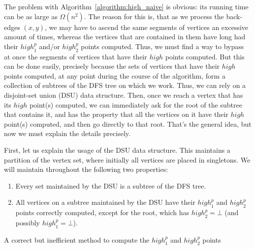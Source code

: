 \documentclass[11pt,a4paper]{article}
\begin{document}
The problem with Algorithm~\ref{algorithm:high_naive} is obvious: its running time can be as large as $\Omega(n^2)$. The reason for this is, that as we process the back-edges $(x,y)$, we may have to ascend the same segments of vertices an excessive amount of times, whereas the vertices that are contained in them have long had their $\mathit{high}^p_1$ and/or $\mathit{high}^p_2$ points computed. Thus, we must find a way to bypass at once the segments of vertices that have their $\mathit{high}$ points computed. But this can be done easily, precisely because the sets of vertices that have their $\mathit{high}$ points computed, at any point during the course of the algorithm, form a collection of subtrees of the DFS tree on which we work. Thus, we can rely on a disjoint-set union (DSU) data structure. Then, once we reach a vertex that has its $\mathit{high}$ point(s) computed, we can immediately ask for the root of the subtree that contains it, and has the property that all the vertices on it have their $\mathit{high}$ point(s) computed, and then go directly to that root. That's the general idea, but now we must explain the details precisely.


First, let us explain the usage of the DSU data structure. This maintains a partition of the vertex set, where initially all vertices are placed in singletons. We will maintain throughout the following two properties:

\begin{enumerate}[label={(\arabic*)}]
\item{Every set maintained by the DSU is a subtree of the DFS tree.}
\item{All vertices on a subtree maintained by the DSU have their $\mathit{high}^p_1$ and $\mathit{high}^p_2$ points correctly computed, except for the root, which has $\mathit{high}^p_2=\bot$ (and possibly $\mathit{high}^p_1=\bot$).}
\end{enumerate}

\begin{algorithm}[h!]
\caption{\textsf{A correct but inefficient method to compute the $\mathit{high}^p_1$ and $\mathit{high}^p_2$ points}}
\label{algorithm:high_naive}
\LinesNumbered
\DontPrintSemicolon


\end{algorithm}
\end{document}
